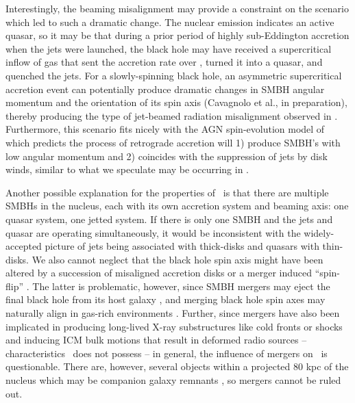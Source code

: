 \documentclass[referee,traditabstract]{aa}
\begin{document}
Interestingly, the beaming misalignment may provide a constraint on
the scenario which led to such a dramatic change. The nuclear emission
indicates an active quasar, so it may be that during a prior period of
highly sub-Eddington accretion when the jets were launched, the black
hole may have received a supercritical inflow of gas \citep[a
  hypothesized fueling mechanism for high-redshift quasars,
  \eg][]{2005ApJ...633..624V} that sent the accretion rate over
\dmcrit, turned it into a quasar, and quenched the jets. For a
slowly-spinning black hole, an asymmetric supercritical accretion
event can potentially produce dramatic changes in SMBH angular
momentum and the orientation of its spin axis (Cavagnolo et al., in
preparation), thereby producing the type of jet-beamed radiation
misalignment observed in \irs. Furthermore, this scenario fits nicely
with the AGN spin-evolution model of \citet{gesspin} which predicts
the process of retrograde accretion will 1) produce SMBH's with low
angular momentum and 2) coincides with the suppression of jets by disk
winds, similar to what we speculate may be occurring in \irs.

Another possible explanation for the properties of \irs\ is that there
are multiple SMBHs in the nucleus, each with its own accretion system
and beaming axis: one quasar system, one jetted system. If there is
only one SMBH and the jets and quasar are operating simultaneously, it
would be inconsistent with the widely-accepted picture of jets being
associated with thick-disks and quasars with thin-disks. We also
cannot neglect that the black hole spin axis might have been altered
by a succession of misaligned accretion disks
\citep[\eg][]{2005MNRAS.363...49K} or a merger induced ``spin-flip''
\citep{2002Sci...297.1310M}. The latter is problematic, however, since
SMBH mergers may eject the final black hole from its host galaxy
\citep[\eg][]{2007ApJ...659L...5C}, and merging black hole spin axes
may naturally align in gas-rich environments
\citep{2007ApJ...661L.147B}. Further, since mergers have also been
implicated in producing long-lived X-ray substructures like cold
fronts or shocks \citep{2007PhR...443....1M} and inducing ICM bulk
motions that result in deformed radio sources
\citep{2009A&A...495..721S} -- characteristics \irs\ does not possess
-- in general, the influence of mergers on \irs\ is
questionable. There are, however, several objects within a projected
80 kpc of the nucleus which may be companion galaxy remnants
\citep{1996AJ....111..649S, 1999Ap&SS.266..113A}, so mergers cannot be
ruled out.
\end{document}
